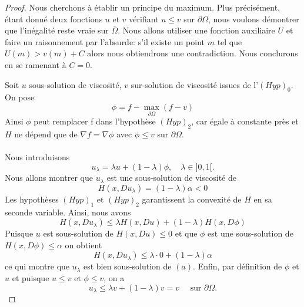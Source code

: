 \begin{proof}

Nous cherchons à établir un principe du maximum. Plus précisément, étant donné deux fonctions $u$ et $v$ vérifiant $ u\leq v$ sur $\partial\Omega$, nous voulons démontrer que l'inégalité reste vraie sur $\overline{\Omega}$. Nous allons utiliser une fonction auxiliaire $U$ et faire un raisonnement par l'absurde: s'il existe un point $m$ tel que $U(m) > v(m) +C$ alors nous obtiendrons une contradiction. Nous conclurons en se ramenant à $C=0$.

Soit $u$ sous-solution de viscosité, $v$ sur-solution de viscosité issues de l'$(Hyp)_0$. On pose 
\begin{equation*}
    \phi=f-\max_{\partial\Omega}(f-v)
\end{equation*}
Ainsi $\phi$ peut remplacer f dans l'hypothèse $(Hyp)_2$, car égale à constante près et $H$ ne dépend que de $\nabla f=\nabla\phi$ avec $\phi\le v$ sur $\partial\Omega$.\\
~\\

Nous introduisons
\begin{equation*}
    u_\lambda= \lambda u+(1-\lambda) \phi, \quad\lambda \in ]0,1[.
\end{equation*}
Nous allons montrer que $u_{\lambda}$ est une sous-solution de viscosité de 
\begin{equation}
    H(x,Du_\lambda)=(1-\lambda)\alpha <0 \tag{a}\label{eqa}
\end{equation}
Les hypothèses $(Hyp)_1$ et $(Hyp)_2$ garantissent la convexité de $H$ en sa seconde variable. Ainsi, nous avons 
\begin{equation*}
    H(x,Du_\lambda)\le\lambda H(x,Du)+(1-\lambda)H(x,D\phi)
\end{equation*}
Puisque $u$ est sous-solution de $H(x,Du)\leq 0$ et que $\phi$ est une sous-solution de $H(x,D\phi)\leq \alpha$ on obtient
\begin{equation*}
    H(x,Du_\lambda)\le \lambda \cdot 0  + (1-\lambda)\alpha
\end{equation*}
ce qui montre que $u_\lambda$ est bien sous-solution de $(a)$.
Enfin, par définition de $\phi$ et $u$ et puisque $u\le v \text{ et } \phi\le v$, on a
\begin{equation*} 
    u_\lambda\le \lambda v+(1-\lambda) v=v \quad\text{ sur } \partial\Omega.
\end{equation*} 


\end{proof}
